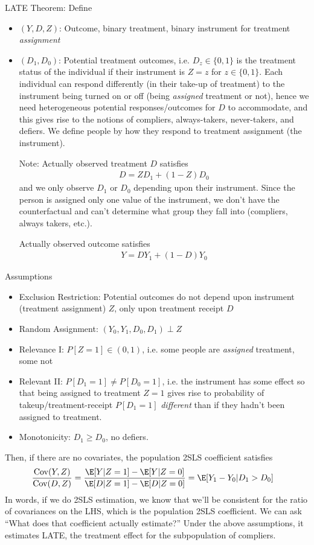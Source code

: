 \documentclass[12pt]{article}
\theoremstyle{plain}
\theoremstyle{definition}
\theoremstyle{remark}
\newcommand{\Cov}{\operatorname{Cov}}
\begin{document}
LATE Theorem:
Define
\begin{itemize}
  \item $(Y,D,Z)$: Outcome, binary treatment, binary instrument for
    treatment \emph{assignment}
  \item $(D_1,D_0)$: Potential treatment outcomes,
    i.e. $D_z\in \{0,1\}$ is the treatment status of the individual
    if their instrument is $Z=z$ for $z\in\{0,1\}$.
    Each individual can respond differently (in their take-up of
    treatment) to the instrument being turned on or off (being
    \emph{assigned} treatment or not), hence we need heterogeneous
    potential responses/outcomes for $D$ to accommodate, and this
    gives rise to the notions of compliers, always-takers,
    never-takers, and defiers. We define people by how they respond
    to treatment assignment (the instrument).

    Note: Actually observed treatment $D$ satisfies
    \begin{align*}
      D = ZD_1 + (1-Z)D_0
    \end{align*}
    and we only observe $D_1$ or $D_0$ depending upon their
    instrument.
    Since the person is assigned only one value of the instrument,
    we don't have the counterfactual and can't determine what group
    they fall into (compliers, always takers, etc.).

    Actually observed outcome satisfies
    \begin{align*}
      Y = DY_1 + (1-D)Y_0
    \end{align*}
\end{itemize}
\clearpage
Assumptions
\begin{itemize}
  \item Exclusion Restriction:
    Potential outcomes do not depend upon instrument (treatment
    assignment) $Z$, only upon treatment receipt $D$
  \item Random Assignment:
    $(Y_0,Y_1,D_0,D_1)\perp Z$
  \item Relevance I:
    $P[Z=1]\in (0,1)$, i.e. some people are \emph{assigned}
    treatment, some not
  \item Relevant II:
    $P[D_1=1]\neq P[D_0=1]$, i.e. the instrument has some effect so
    that being assigned to treatment $Z=1$ gives rise to probability
    of takeup/treatment-receipt $P[D_1=1]$ \emph{different}
    than if they hadn't been assigned to treatment.
  \item
    Monotonicity:
    $D_1\geq D_0$, no defiers.
\end{itemize}
Then, if there are no covariates, the population 2SLS coefficient
satisfies
\begin{align*}
  \frac{\Cov(Y,Z)}{\Cov(D,Z)}
  &=
  \frac{\E[Y|Z=1]-\E[Y|Z=0]}{\E[D|Z=1]-\E[D|Z=0]}
  =
  \E[Y_1-Y_0|D_1>D_0]
\end{align*}
In words, if we do 2SLS estimation, we know that we'll be consistent
for the ratio of covariances on the LHS, which is the population
2SLS coefficient.
We can ask ``What does that coefficient actually estimate?''
Under the above assumptions, it estimates LATE, the treatment effect
for the subpopulation of compliers.
\end{document}
